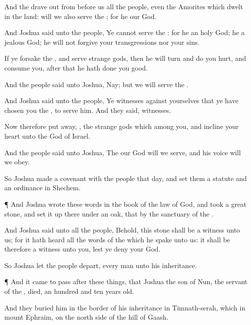 {And the
{} drave
out from
before us all the
people, even the
Amorites which
dwelt in the
land:
{} will we also
serve the
{}; for he
{} our
God.

And
Joshua
said unto the
people, Ye
cannot
serve the
{}: for he
{} an
holy
God; he
{} a
jealous
God; he will not
forgive your
transgressions nor your
sins.

If ye
forsake the
{}, and
serve
strange
gods, then he will
turn and do you
hurt, and
consume you,
after that he hath done you
good.

And the
people
said unto
Joshua, Nay; but we will
serve the
{}.

And
Joshua
said unto the
people, Ye
{}
witnesses against yourselves that ye have
chosen you the
{}, to
serve him. And they
said,
{}
witnesses.

Now therefore put
away,
{}, the
strange
gods which
{}
among you, and
incline your
heart unto the
{}
God of
Israel.

And the
people
said unto
Joshua, The
{} our
God will we
serve, and his
voice will we
obey.

So
Joshua
made a
covenant with the
people that
day, and
set them a
statute and an
ordinance in
Shechem.


\par }{\PP {}¶ And
Joshua
wrote these
words in the
book of the
law of
God, and
took a
great
stone, and set it
up there under an
oak, that
{} by the
sanctuary of the
{}.

And
Joshua
said unto all the
people, Behold, this
stone shall be a
witness unto us; for it hath
heard all the
words of the
{} which he
spake unto us: it shall be therefore a
witness unto you, lest ye
deny your
God.

So
Joshua let the
people
depart, every
man unto his
inheritance.


\par }{\PP {}¶ And it came to pass
after these
things, that
Joshua the
son of
Nun, the
servant of the
{},
died,
{} an
hundred and
ten
years
old.

And they
buried him in the
border of his
inheritance in
Timnath-serah, which
{} in
mount
Ephraim, on the north
side of the
hill of
Gaash.

}

